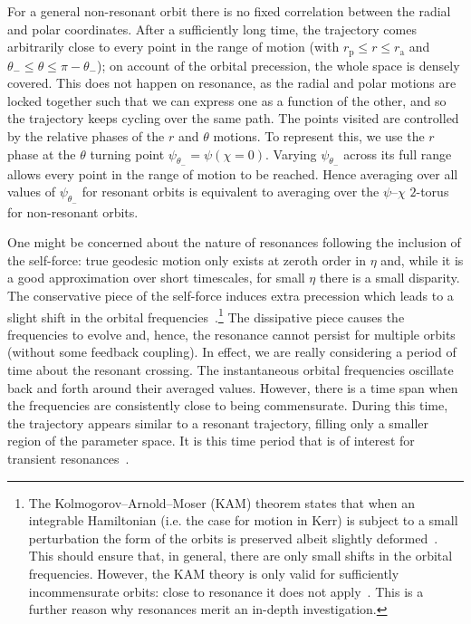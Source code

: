 \documentclass[aps,prd,amsfonts,amssymb,amsmath,nofootinbib,showpacs,superscriptaddress,twocolumn]{revtex4}
\newcommand{\sub}[1]{\ensuremath{_\mathrm{#1}}}
\begin{document}
For a general non-resonant orbit there is no fixed correlation between the radial and polar coordinates. After a sufficiently long time, the trajectory comes arbitrarily close to every point in the range of motion (with $r\sub{p} \leq r \leq r\sub{a}$ and $\theta_- \leq \theta \leq \pi - \theta_-$); on account of the orbital precession, the whole space is densely covered. This does not happen on resonance, as the radial and polar motions are locked together such that we can express one as a function of the other, and so the trajectory keeps cycling over the same path. The points visited are controlled by the relative phases of the $r$ and $\theta$ motions. To represent this, we use the $r$ phase at the $\theta$ turning point $\psi_{\theta_-} = \psi(\chi = 0)$. Varying $\psi_{\theta_-}$ across its full range allows every point in the range of motion to be reached. Hence averaging over all values of $\psi_{\theta_-}$ for resonant orbits is equivalent to averaging over the $\psi$--$\chi$ $2$-torus for non-resonant orbits.

One might be concerned about the nature of resonances following the inclusion of the self-force: true geodesic motion only exists at zeroth order in $\eta$ and, while it is a good approximation over short timescales, for small $\eta$ there is a small disparity. The conservative piece of the self-force induces extra precession which leads to a slight shift in the orbital frequencies~\cite{Warburton2012}.\footnote{The Kolmogorov--Arnold--Moser (KAM) theorem states that when an integrable Hamiltonian (i.e. the case for motion in Kerr) is subject to a small perturbation the form of the orbits is preserved albeit slightly deformed~\cite{Arnold1963,Moser1973}. %
This should ensure that, in general, there are only small shifts in the orbital frequencies. However, the KAM theory is only valid for sufficiently incommensurate orbits: close to resonance it does not apply~\cite{Moser1973}. %
This is a further reason why resonances merit an in-depth investigation.}
The dissipative piece causes the frequencies to evolve and, hence, the resonance cannot persist for multiple orbits (without some feedback coupling). In effect, we are really considering a period of time about the resonant crossing. The instantaneous orbital frequencies oscillate back and forth around their averaged values. However, there is a time span when the frequencies are consistently close to being commensurate. During this time, the trajectory appears similar to a resonant trajectory, filling only a smaller region of the parameter space. It is this time period that is of interest for transient resonances~\cite{Bosley1992}.
\end{document}
